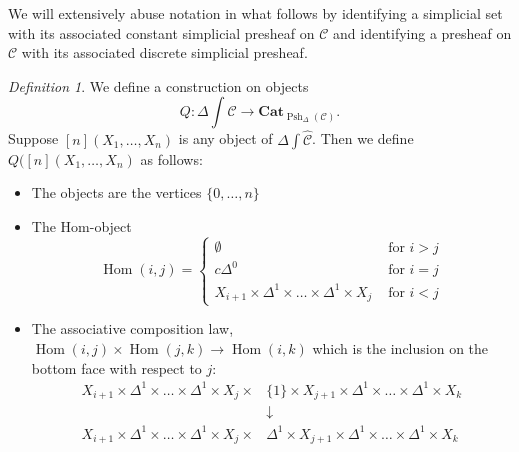 \documentclass[leqno]{article}
\numberwithin{equation}{subsection}
\theoremstyle{plain}   %
\theoremstyle{remark}
\newtheorem{defn}[equation]{Definition}
\theoremstyle{plain}
\newcommand{\Cat}{\ensuremath{\mathbf{Cat}}}
\DeclareMathOperator{\Hom}{Hom}
\newcommand{\psh}[1]{\ensuremath{\widehat{#1}}}
\newcommand{\C}{\ensuremath{\mathcal{C}}}
\newcommand{\spsh}{\ensuremath{\operatorname{Psh}_\Delta(\mathcal{C})}}
\begin{document}
We will extensively abuse notation in what follows by identifying a simplicial set with its associated constant simplicial presheaf on \(\C\) and identifying a presheaf on \(\C\) with its associated discrete simplicial presheaf.

\begin{defn}
	We define a construction on objects \[Q:\Delta\int\psh{\C}\to \Cat_{\spsh}.\] Suppose \([n](X_1,\dots, X_n)\) is any object of \(\Delta\int\psh{\C}\). Then we define \(Q([n](X_1,\dots,X_n)\) as follows:
	\begin{itemize}
		\item The objects are the vertices \(\{0,\dots,n\}\)
		\item The Hom-object
		      \[\Hom(i,j)=
			      \begin{cases}
				      \emptyset                                                & \text{ for } i>j \\
				      c\Delta^0                                                & \text{ for } i=j \\
				      X_{i+1} \times \Delta^1 \times \dots \times \Delta^1 \times X_j & \text{ for } i<j
			      \end{cases}
		      \]
		\item The associative composition law, \(\Hom(i,j)\times \Hom(j,k)\to \Hom(i,k)\) which is the inclusion on the bottom face with respect to \(j\):
		      \begin{align*}
			      X_{i+1}\times \Delta^1\times\dots\times\Delta^1\times X_j \times & \{1\}\times X_{j+1} \times \Delta^1\times\dots\times\Delta^1\times X_k    \\
			                                                                       & \downarrow                                                                \\
			      X_{i+1}\times \Delta^1\times\dots\times\Delta^1\times X_j\times  & \Delta^1\times X_{j+1} \times \Delta^1\times\dots\times\Delta^1\times X_k
		      \end{align*}
	\end{itemize}
\end{defn}
\end{document}
